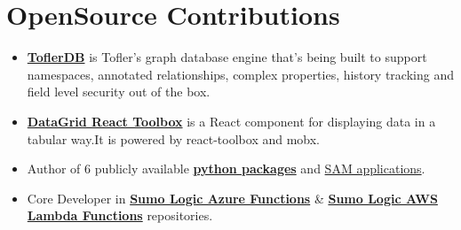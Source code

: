 \documentclass[margin,line]{resume}
\begin{document}
\begin{resume}
\begin{itemize}
    \end{itemize}



\section{\mysidestyle OpenSource Contributions}
\vspace{0mm}
    \begin{itemize}
                \item \href{https://github.com/tofler/toflerdb}{\textbf{ToflerDB}} is Tofler's graph database engine that's being built to support namespaces, annotated relationships, complex properties, history tracking and field level security out of the box.
                \item \href{https://github.com/tofler/datagrid-react-toolbox}{\textbf{DataGrid React Toolbox}} is a React component for displaying data in a tabular way.It is powered by react-toolbox and mobx.
                \item
                Author of 6 publicly available \href{https://pypi.org/user/himanshu_pal/}{\textbf{python packages}} and \href{https://shr32taah3.execute-api.us-east-1.amazonaws.com/Prod/applications/search?pageSize=12&pageNumber=1&searchText=sumologic&category=&runtime=&verified=&includeAppsWithCapabilities=CAPABILITY_IAM%2CCAPABILITY_NAMED_IAM%2CCAPABILITY_RESOURCE_POLICY%2CCAPABILITY_AUTO_EXPAND&sortFields=deploymentCount%3Adesc}{SAM applications}.
                \item 
                Core Developer in \href{https://github.com/SumoLogic/sumologic-azure-function}{\textbf{Sumo Logic Azure Functions}} \& \href{https://github.com/SumoLogic/sumologic-aws-lambda}{\textbf{Sumo Logic AWS Lambda Functions}} repositories.

    \end{itemize}


\end{resume}
\end{document}
